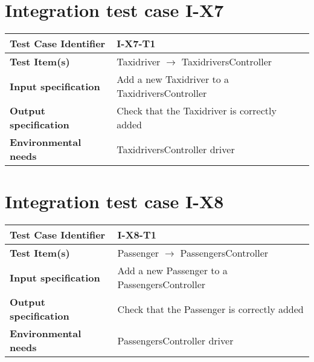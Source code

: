 \section{Integration test case I-X7}
\begin{tabular*}{1.23\textwidth}{ l l }
 \textbf{Test Case Identifier}		& I-X7-T1 \\
 \hline
 \textbf{Test Item(s)}			& Taxidriver $\rightarrow$ TaxidriversController \\
 \hline
 \textbf{Input specification}		& Add a new Taxidriver to a TaxidriversController \\
 \hline
 \textbf{Output specification}		& Check that the Taxidriver is correctly added \\
 \hline
 \textbf{Environmental needs}		& TaxidriversController driver \\
\end{tabular*}

\section{Integration test case I-X8}
\begin{tabular*}{1.23\textwidth}{ l l }
 \textbf{Test Case Identifier}		& I-X8-T1 \\
 \hline
 \textbf{Test Item(s)}			& Passenger $\rightarrow$ PassengersController \\
 \hline
 \textbf{Input specification}		& Add a new Passenger to a PassengersController \\
 \hline
 \textbf{Output specification}		& Check that the Passenger is correctly added \\
 \hline
 \textbf{Environmental needs}		& PassengersController driver \\
\end{tabular*}


